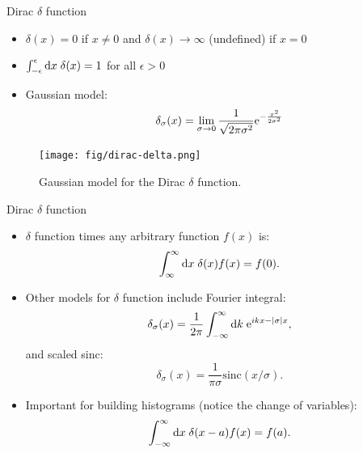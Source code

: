 \documentclass[10pt]{beamer}
\begin{document}
\begin{frame}{Dirac $\delta$ function}
\begin{itemize}
\setlength\itemsep{1em}
  \item $\delta(x)=0$ if $x \neq 0$ and $\delta(x) \rightarrow \infty$ (undefined) if $x=0$
  \item $\int_{-\epsilon}^{\epsilon}\mathrm{d} x\; \delta(x) = 1$ for all $\epsilon > 0$
  \item Gaussian model:
  \begin{equation}
    \delta_\sigma(x) = \lim_{\sigma \rightarrow 0} \frac{1}{\sqrt{2\pi\sigma^2}} \mathrm{e}^{-\frac{x^2}{2\sigma^2}}
  \end{equation}
\end{itemize}
\begin{figure}
  \texttt{[image: fig/dirac-delta.png]}
  \caption{Gaussian model for the Dirac $\delta$ function.}
\end{figure}
\end{frame}

\begin{frame}{Dirac $\delta$ function}
\begin{itemize}
\setlength\itemsep{1em}
  \item $\delta$ function times any arbitrary function $f(x)$ is:
  \begin{equation}
    \int_\infty^\infty \mathrm{d} x\; \delta(x)f(x) = f(0).
  \end{equation}

  \item Other models for $\delta$ function include Fourier integral:
  \begin{equation}
    \delta_\sigma(x) = \frac{1}{2\pi} \int_{-\infty}^\infty \mathrm{d} k\; \mathrm{e}^{ikx-|\sigma|x},
  \end{equation}
  and scaled sinc:
  \begin{equation}
    \delta_\sigma(x) = \frac{1}{\pi\sigma}\mathrm{sinc}(x/\sigma).
  \end{equation}

  \item Important for building histograms (notice the change of variables):
  \begin{equation}
    \int_{-\infty}^\infty \mathrm{d} x\; \delta(x-a)f(x) = f(a).
  \end{equation}
\end{itemize}
\end{frame}
\end{document}
